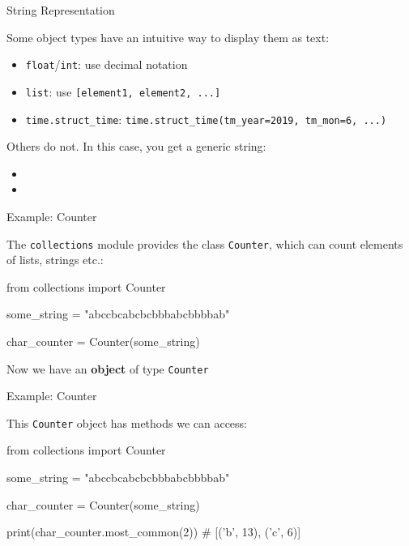 \begin{frame}{String Representation}

    Some object types have an intuitive way to display them as text:
    \begin{itemize}
        \item {\tt float}/{\tt int}: use decimal notation
        \item {\tt list}: use {\tt [element1, element2, ...]}
        \item {\tt time.struct\_time}: {\tt time.struct\_time(tm\_year=2019, tm\_mon=6, ...)}
    \end{itemize}

    Others do not. In this case, you get a generic string:
    \begin{itemize}
        \item {\tt <enumerate object at 0x7f38491d75a0>}
        \item {\tt <function test at 0x7f384941b400>}
    \end{itemize}

\end{frame}

\begin{frame}[fragile]{Example: Counter}

    The {\tt collections} module provides the class {\tt Counter}, which can count elements of lists, strings etc.:

    \vspace{1em}

    \begin{pythoncode}
    from collections import Counter

    some_string = "abccbcabcbcbbbabcbbbbab"

    char_counter = Counter(some_string)
    \end{pythoncode}

    \vspace{1em}

    Now we have an {\bf object} of type {\tt Counter}

\end{frame}

\begin{frame}[fragile]{Example: Counter}

    This {\tt Counter} object has methods we can access:

    \vspace{1em}

    \begin{pythoncode}
    from collections import Counter

    some_string = "abccbcabcbcbbbabcbbbbab"

    char_counter = Counter(some_string)

    print(char_counter.most_common(2))
    # [('b', 13), ('c', 6)]
    \end{pythoncode}

\end{frame}


